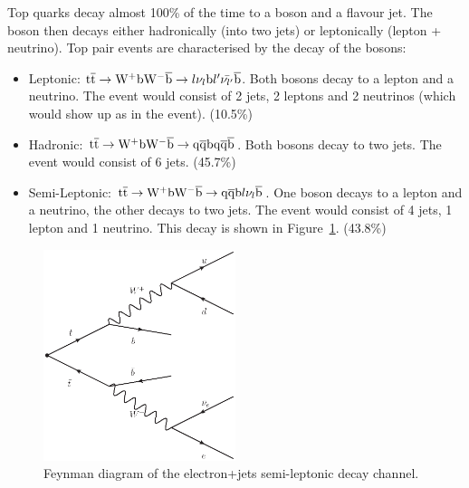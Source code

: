 Top quarks decay almost 100\% of the time to a \W boson and a \cPqb flavour jet. The \W boson then decays
either hadronically (into two jets) or leptonically (lepton + neutrino). Top pair events are characterised by the
decay of the \W bosons:
\begin{itemize}
  \item Leptonic: $\mathrm{t}\overline{\mathrm{t}} \rightarrow \mathrm{W}^{+} \mathrm{b} \mathrm{W}^{-} \overline{\mathrm{b}} \rightarrow l \nu_{l}\mathrm{b}
  l' \bar{\nu_{l'}} \overline{\mathrm{b}}$.
  Both \W bosons decay to a lepton and a neutrino. The event would consist of 2 jets, 2 leptons and 2
  neutrinos (which would show up as \met in the event). (10.5\%)
  \item Hadronic: $\mathrm{t}\overline{\mathrm{t}} \rightarrow \mathrm{W}^{+} \mathrm{b} \mathrm{W}^{-} \overline{\mathrm{b}} \rightarrow \mathrm{q} \overline{\mathrm{q}} \mathrm{b} \mathrm{q} \overline{\mathrm{q}}
  \overline{\mathrm{b}}$. Both \W bosons decay to two jets. The event would consist of 6 jets. (45.7\%)
  \item Semi-Leptonic: $\mathrm{t}\overline{\mathrm{t}} \rightarrow \mathrm{W}^{+} \mathrm{b} \mathrm{W}^{-} \overline{\mathrm{b}} \rightarrow \mathrm{q} \overline{\mathrm{q}} \mathrm{b} l \nu_{l}
  \overline{\mathrm{b}}$. One \W boson decays to a lepton and a neutrino, the other decays to two jets. The event would
  consist of 4 jets, 1 lepton and 1 neutrino. This decay is shown in Figure~\ref{fig:semileptonic_decay}.
  (43.8\%)
\end{itemize}

\begin{figure}[hbtp]
   \centering
     \includegraphics[width=0.5\textwidth]{Chapters/03_Theory/Images/semileptonic_decay}\hfill
     \caption[Feynman diagram of the electron+jets semi-leptonic \ttbar decay channel.]{Feynman diagram of the
     electron+jets semi-leptonic \ttbar decay channel.}
     \label{fig:semileptonic_decay}
\end{figure}


